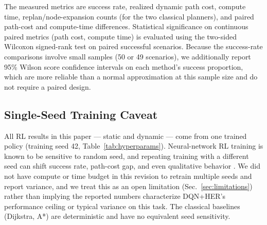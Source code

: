 The measured metrics are success rate, realized dynamic path cost, compute time, replan/node-expansion counts (for the two classical planners), and paired path-cost and compute-time differences. Statistical significance on continuous paired metrics (path cost, compute time) is evaluated using the two-sided Wilcoxon signed-rank test on paired successful scenarios. Because the success-rate comparisons involve small samples (50 or 49 scenarios), we additionally report 95\% Wilson score confidence intervals \cite{wilson1927interval} on each method's success proportion, which are more reliable than a normal approximation at this sample size and do not require a paired design.

\subsection{Single-Seed Training Caveat}

All RL results in this paper --- static and dynamic --- come from one trained policy (training seed 42, Table~\ref{tab:hyperparams}). Neural-network RL training is known to be sensitive to random seed, and repeating training with a different seed can shift success rate, path-cost gap, and even qualitative behavior \cite{henderson2018deep}. We did not have compute or time budget in this revision to retrain multiple seeds and report variance, and we treat this as an open limitation (Sec.~\ref{sec:limitations}) rather than implying the reported numbers characterize DQN+HER's performance ceiling or typical variance on this task. The classical baselines (Dijkstra, A*) are deterministic and have no equivalent seed sensitivity.
